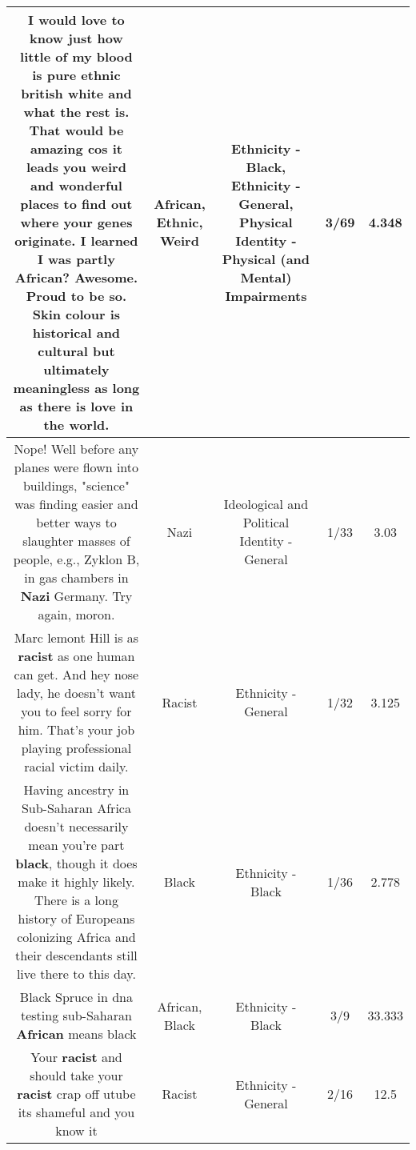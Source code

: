 \documentclass[11pt]{article}
\newlength\mylength
\begin{document}
\begin{center}
\begin{longtable}{|C{.65\mylength}|C{.30\mylength}|C{.12\mylength}|C{.12\mylength}|C{.12\mylength}|}
  \small I would love to know just how little of my blood is pure \textbf{ethnic} british white and what the rest is. That would be amazing cos it leads you \textbf{weird} and wonderful places to find out where your genes originate. I learned I was partly \textbf{African}? Awesome. Proud to be so. Skin colour is historical and cultural but ultimately meaningless as long as there is love in the world.\normalsize   & African, Ethnic, Weird & Ethnicity - Black, Ethnicity - General, Physical Identity - Physical (and Mental) Impairments & 3/69 & 4.348 \\  \hline
  \small Nope!  Well before any planes were flown into buildings, "science" was finding easier and better ways to slaughter masses of people, e.g., Zyklon B, in gas chambers in \textbf{Nazi} Germany.  Try again, moron.\normalsize   & Nazi &  Ideological and Political Identity - General & 1/33 & 3.03 \\  \hline
  \small Marc lemont Hill is as \textbf{racist} as one human can get. And hey nose lady, he doesn't want you to feel sorry for him. That's your job playing professional racial victim daily.\normalsize   & Racist & Ethnicity - General & 1/32 & 3.125 \\  \hline
  \small Having ancestry in Sub-Saharan Africa doesn't necessarily mean you're part \textbf{black}, though it does make it highly likely. There is a long history of Europeans colonizing Africa and their descendants still live there to this day.\normalsize   & Black & Ethnicity - Black & 1/36 & 2.778 \\  \hline
  \small Black Spruce in dna testing sub-Saharan \textbf{African} means black\normalsize   & African, Black & Ethnicity - Black & 3/9 & 33.333 \\  \hline
  \small Your \textbf{racist} and should take your \textbf{racist} crap off utube its shameful and you know it\normalsize   & Racist & Ethnicity - General & 2/16 & 12.5 \\  \hline

\end{longtable}
\end{center}
\end{document}
